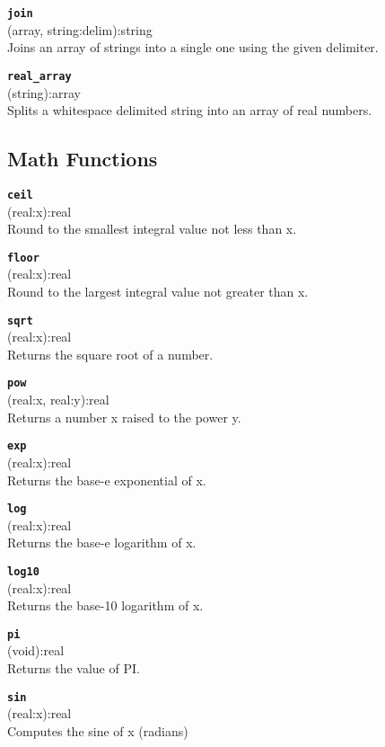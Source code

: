 \documentclass{article}
\begin{document}
{\large \texttt{\textbf{join}}}\\
\textsf{ (array, string:delim):string }\\
Joins an array of strings into a single one using the given delimiter.

{\large \texttt{\textbf{real\_array}}}\\
\textsf{ (string):array }\\
Splits a whitespace delimited string into an array of real numbers.

\subsection{Math Functions}
{\large \texttt{\textbf{ceil}}}\\
\textsf{ (real:x):real }\\
Round to the smallest integral value not less than x.

{\large \texttt{\textbf{floor}}}\\
\textsf{ (real:x):real }\\
Round to the largest integral value not greater than x.

{\large \texttt{\textbf{sqrt}}}\\
\textsf{ (real:x):real }\\
Returns the square root of a number.

{\large \texttt{\textbf{pow}}}\\
\textsf{ (real:x, real:y):real }\\
Returns a number x raised to the power y.

{\large \texttt{\textbf{exp}}}\\
\textsf{ (real:x):real }\\
Returns the base-e exponential of x.

{\large \texttt{\textbf{log}}}\\
\textsf{ (real:x):real }\\
Returns the base-e logarithm of x.

{\large \texttt{\textbf{log10}}}\\
\textsf{ (real:x):real }\\
Returns the base-10 logarithm of x.

{\large \texttt{\textbf{pi}}}\\
\textsf{ (void):real }\\
Returns the value of PI.

{\large \texttt{\textbf{sin}}}\\
\textsf{ (real:x):real }\\
Computes the sine of x (radians)
\end{document}
